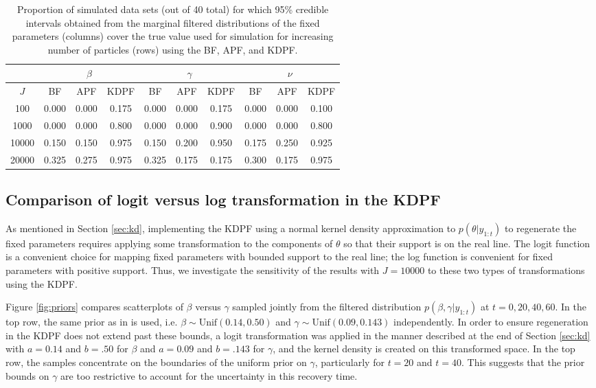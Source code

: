 \documentclass{elsarticle}
\begin{document}
\begin{table}
\begin{center}
\begin{tabular}{|c|ccc|ccc|ccc|}
\hline
  & \multicolumn{3}{|c|}{$\beta$} & \multicolumn{3}{|c|}{$\gamma$} & \multicolumn{3}{|c|}{$\nu$} \\
  \hline
  $J$ & BF & APF & KDPF & BF & APF & KDPF & BF & APF & KDPF \\
  \hline
  100 & 0.000 & 0.000 & 0.175 & 0.000 & 0.000 & 0.175 & 0.000 & 0.000 & 0.100 \\
  \hline
  1000 & 0.000 & 0.000 & 0.800 & 0.000 & 0.000 & 0.900 & 0.000 & 0.000 & 0.800 \\
  \hline
  10000 & 0.150 & 0.150 & 0.975 & 0.150 & 0.200 & 0.950 & 0.175 & 0.250 & 0.925 \\
  \hline
  20000 & 0.325 & 0.275 & 0.975 & 0.325 & 0.175 & 0.175 & 0.300 & 0.175 & 0.975 \\
\hline
\end{tabular}
\caption{Proportion of simulated data sets (out of 40 total) for which 95\% credible intervals obtained from the marginal filtered distributions of the fixed parameters (columns) cover the true value used for simulation for increasing number of particles (rows) using the BF, APF, and KDPF.} \label{tab:pfs}
\end{center}
\end{table}

\subsection{Comparison of logit versus log transformation in the KDPF \label{sec:priors}}

As mentioned in Section \ref{sec:kd}, implementing the KDPF using a normal kernel density approximation to $p(\theta|y_{1:t})$ to regenerate the fixed parameters requires applying some transformation to the components of $\theta$ so that their support is on the real line. The logit function is a convenient choice for mapping fixed parameters with bounded support to the real line; the log function is convenient for fixed parameters with positive support. Thus, we investigate the sensitivity of the results with $J = 10000$ to these two types of transformations using the KDPF.

Figure \ref{fig:priors} compares scatterplots of $\beta$ versus $\gamma$ sampled jointly from the filtered distribution $p(\beta,\gamma|y_{1:t})$ at $t = 0, 20, 40, 60$. In the top row, the same prior as in \citet{skvortsov2012monitoring} is used, i.e. $\beta\sim \mbox{Unif}( 0.14, 0.50)$ and $\gamma\sim \mbox{Unif}(0.09, 0.143)$ independently. In order to ensure regeneration in the KDPF does not extend past these bounds, a logit transformation was applied in the manner described at the end of Section \ref{sec:kd} with $a = 0.14$ and $b = .50$ for $\beta$ and $a = 0.09$ and $b = .143$ for $\gamma$, and the kernel density is created on this transformed space. In the top row, the samples concentrate on the boundaries of the uniform prior on $\gamma$, particularly for $t = 20$ and $t = 40$. This suggests that the prior bounds on $\gamma$ are too restrictive to account for the uncertainty in this recovery time.
\end{document}
